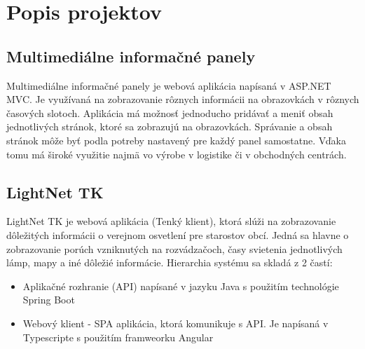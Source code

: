 \documentclass[11pt, oneside]{report}
\begin{document}
\listoffigures

\newpage 

\listoftables
{}




 



\chapter{Popis projektov}
\section{Multimediálne informačné panely}
Multimediálne informačné panely\cite{panely} je webová aplikácia napísaná v ASP.NET  MVC. Je využívaná na zobrazovanie rôznych  informácii na obrazovkách v rôznych časových slotoch. Aplikácia má  možnosť  jednoducho pridávať a meniť obsah  jednotlivých stránok, ktoré sa zobrazujú na obrazovkách.  Správanie a obsah stránok môže byť podla potreby nastavený pre každý panel samostatne. Vďaka tomu má široké využitie najmä  vo výrobe v logistike či v obchodných centrách.
\section{LightNet TK}
LightNet TK je webová aplikácia (Tenký klient), ktorá slúži na zobrazovanie dôležitých informácii o verejnom osvetlení pre starostov obcí. Jedná sa hlavne o zobrazovanie porúch vzniknutých na rozvádzačoch, časy svietenia jednotlivých lámp, mapy a iné dôležié informácie. Hierarchia systému sa  skladá z 2 častí:
\begin{itemize}
\item Aplikačné rozhranie (API) napísané v jazyku Java s použitím technológie Spring Boot
\item Webový klient - SPA aplikácia, ktorá komunikuje s API. Je napísaná v Typescripte s použitím framweorku Angular
\end{itemize} 
\end{document}
